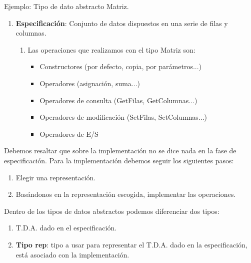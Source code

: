 \documentclass[10pt,a4paper,spanish]{report}
\begin{document}
\noindent
Ejemplo: Tipo de dato abstracto Matriz.
\begin{enumerate}[$\heartsuit$]
\item \textbf{\textcolor[rgb]{0.8,0.2,0.2}{Especificación}}: Conjunto de datos dispuestos en una serie de filas y columnas.
\begin{enumerate}[---]
\item Las operaciones que realizamos con el tipo Matriz son:
\begin{itemize}
\item Constructores (por defecto, copia, por parámetros...)
\item Operadores (asignación, suma...)
\item Operadores de consulta (GetFilas, GetColumnas...)
\item Operadores de modificación (SetFilas, SetColumnas...)
\item Operadores de E/S
\end{itemize}
\end{enumerate}
\end{enumerate}

\noindent
Debemos resaltar que sobre la implementación no se dice nada en la fase de especificación.
Para la implementación debemos seguir los siguientes pasos:
\begin{enumerate}[1.]
\item Elegir una representación.
\item Basándonos en la representación escogida, implementar las operaciones.
\end{enumerate}

\noindent
Dentro de los tipos de datos abstractos podemos diferenciar dos tipos:
\begin{enumerate}[$\spadesuit$]
\item T.D.A. dado en el especificación.
\item \textbf{\textcolor[rgb]{0.8,0.2,0.2}{Tipo rep}}: tipo a usar para representar el T.D.A. dado en la especificación, 
está asociado con la implementación.
\end{enumerate}
\end{document}
